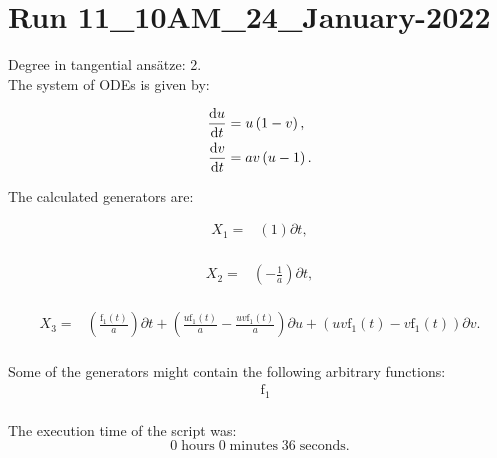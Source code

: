 \section*{Run 11\_10AM\_24\_January-2022}
Degree in tangential ansätze:	2.\\
The system of ODEs is given by:

\begin{align*}
\dv{u}{t}&=u \left(1 - v\right),\\
\dv{v}{t}&=a v \left(u - 1\right).\\
\end{align*}

\noindent The calculated generators are:

\begin{align*}
X_{1}=&\left(1 \right)\partial t,\\
\end{align*}

\begin{align*}
X_{2}=&\left(- \frac{1}{a} \right)\partial t,\\
\end{align*}

\begin{align*}
X_{3}=&\left(\frac{\operatorname{f_{1}}{\left(t \right)}}{a} \right)\partial t+\left(\frac{u \operatorname{f_{1}}{\left(t \right)}}{a}- \frac{u v \operatorname{f_{1}}{\left(t \right)}}{a} \right)\partial u+\left(u v \operatorname{f_{1}}{\left(t \right)} - v \operatorname{f_{1}}{\left(t \right)} \right)\partial v.\\
\end{align*}



\noindent Some of the generators might contain the following arbitrary functions:
\begin{align*}
&\operatorname{f_{1}}\\
\end{align*}

\noindent The execution time of the script was:
$$0\;\mathrm{hours}\;0\;\mathrm{minutes}\;36 \;\mathrm{seconds}.$$

